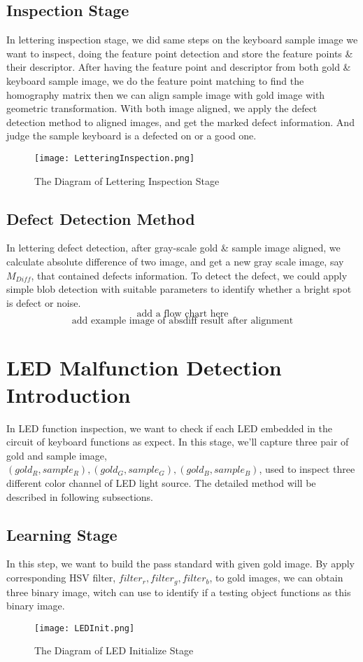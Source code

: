 	\subsection{Inspection Stage}
		In lettering inspection stage, we did same steps on the keyboard sample image we want to inspect, doing the feature point detection and store the feature points \& their descriptor.
		After having the feature point and descriptor from both gold \& keyboard sample image, we do the feature point matching to find the homography matrix then we can align sample image with gold image with geometric transformation. 
		With both image aligned, we apply the defect detection method to aligned images, and get the marked defect information.
		And judge the sample keyboard is a defected on or a good one.
		\begin{figure}
			\texttt{[image: LetteringInspection.png]}
			\caption{The Diagram of Lettering Inspection Stage}
			\label{fig:LetteringInspection}
		\end{figure}

	\subsection{Defect Detection Method}
		In lettering defect detection, after gray-scale gold \& sample image aligned, we calculate absolute difference of two image, and get a new gray scale image, say $M_{Diff}$, that contained defects information.
		To detect the defect, we could apply simple blob detection with suitable parameters to identify whether a bright spot is defect or noise.
		$$ \textrm{add a flow chart here} $$
		$$ \textrm{add example image of absdiff result after alignment} $$

\section{LED Malfunction Detection Introduction}
	In LED function inspection, we want to check if each LED embedded in the circuit of keyboard functions as expect.
	In this stage, we'll capture three pair of gold and sample image, $(gold_R, sample_R), (gold_G, sample_G), (gold_B, sample_B)$, used to inspect three different color channel of LED light source.
	The detailed method will be described in following subsections.
	\subsection{Learning Stage}
		In this step, we want to build the pass standard with given gold image.
		By apply corresponding HSV filter, $filter_r, filter_g, filter_b$, to gold images, we can obtain three binary image, witch can use to identify if a testing object functions as this binary image.
		\begin{figure}
			\texttt{[image: LEDInit.png]}
			\caption{The Diagram of LED Initialize Stage}
			\label{fig:LEDInit}
		\end{figure}

